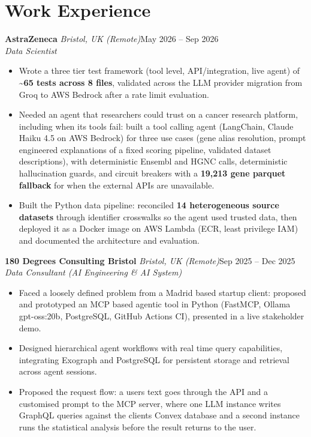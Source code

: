 \documentclass[a4paper,11pt]{article}
\newcommand{\role}[4]{%
  \textbf{#1}{\color{muted}\,\textperiodcentered\,\textit{#2}}\hfill{\color{muted}#3}\\
  \textit{#4}\par}
\newcommand{\gap}{\vspace{5pt}}
\newcommand{\num}[1]{\textbf{#1}}   %
\begin{document}
\section{Work Experience}
\role{AstraZeneca}{Bristol, UK (Remote)}{May 2026 – Sep 2026}{Data Scientist}
\begin{itemize}
  \item Wrote a three tier test framework (tool level, API/integration, live agent) of \num{\textasciitilde{}65 tests across 8 files}, validated across the LLM provider migration from Groq to AWS Bedrock after a rate limit evaluation.
  \item Needed an agent that researchers could trust on a cancer research platform, including when its tools fail: built a tool calling agent (LangChain, Claude Haiku 4.5 on AWS Bedrock) for three use cases (gene alias resolution, prompt engineered explanations of a fixed scoring pipeline, validated dataset descriptions), with deterministic Ensembl and HGNC calls, deterministic hallucination guards, and circuit breakers with a \num{19,213 gene parquet fallback} for when the external APIs are unavailable.
  \item Built the Python data pipeline: reconciled \num{14 heterogeneous source datasets} through identifier crosswalks so the agent used trusted data, then deployed it as a Docker image on AWS Lambda (ECR, least privilege IAM) and documented the architecture and evaluation.
\end{itemize}
\gap
{}
\role{180 Degrees Consulting Bristol}{Bristol, UK (Remote)}{Sep 2025 – Dec 2025}{Data Consultant (AI Engineering \& AI System)}
\begin{itemize}
  \item Faced a loosely defined problem from a Madrid based startup client: proposed and prototyped an MCP based agentic tool in Python (FastMCP, Ollama gpt-oss:20b, PostgreSQL, GitHub Actions CI), presented in a live stakeholder demo.
  \item Designed hierarchical agent workflows with real time query capabilities, integrating Exograph and PostgreSQL for persistent storage and retrieval across agent sessions.
  \item Proposed the request flow: a user\textquotesingle{}s text goes through the API and a customised prompt to the MCP server, where one LLM instance writes GraphQL queries against the client\textquotesingle{}s Convex database and a second instance runs the statistical analysis before the result returns to the user.
\end{itemize}
\end{document}
